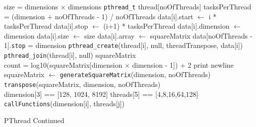 \documentclass[10pt,twocolumn]{witseiepaper}
\begin{document}
\begin{appendix}
\begin{algorithm}[htbp]
	\begin{algorithmic}
		
		\State size = dimensions $\times$ dimensions
		\State \verb|pthread_t| thread[noOfThreads]
		\State tasksPerThread = (dimension + noOfThreads - 1) / noOfThreads
		\State data[i].start $\leftarrow$ i * tasksPerThread
		\State data[i].stop $\leftarrow$ (i+1) * tasksPerThread
		\State data[i].dimension $\leftarrow$ dimension
		\State data[i].size $\leftarrow$ size
		\State data[i].array $\leftarrow$ squareMatrix
		\EndFor
		\State data[noOfThreads - 1].\verb|stop| = dimension
		\State \verb|pthread_create|(thread[i], null, threadTranspose, data[i])
		\EndFor
		\State \verb|pthread_join|(thread[i], null)
		\EndFor
		\State \Return squareMatrix
		\EndFunction \\
		
		\State count = log10(squareMatrix[dimension $\times$ dimension - 1]) + 2
		\State print newline
		\EndIf
		\EndFor
		\EndFunction \\
		
		\State squareMatrix $\leftarrow$ \verb|generateSquareMatrix|(dimension, noOfThreads)
		\State \verb|transpose|(squareMatrix, dimension, noOfThreads)
		\EndFunction \\
		
		\State dimension[3] == [128, 1024, 8192]
		\State threads[5] == [4,8,16,64,128]
		\State \verb|callFunctions|(dimension[i], threads[j])
		\EndFor
		\EndFor
		\State {}
		\EndFunction
		
		\caption{PThread Continued}
		\label{alg:4}
	\end{algorithmic}
\end{algorithm}
		

\end{appendix}
\end{document}
